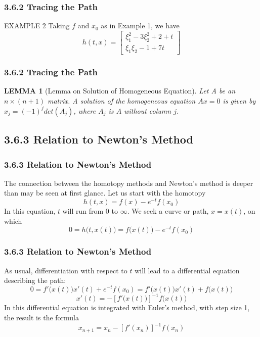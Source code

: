 \documentclass[notheorems,mathserif,table,compress]{beamer}  %
\begin{document}
\begin{frame}
  \frametitle{3.6.2 Tracing the Path}
  \begin{exampleblock}{EXAMPLE 2}  
  Taking $f$ and $x_0$ as in Example 1, we have 
  \begin{displaymath}
  h(t,x)=
  \left[ \begin{array}{ccc}
  \xi_1 ^2-3\xi_2 ^2+2+t\\
  \xi_1\xi_2-1+7t
  \end{array} \right]
  \end{displaymath}
  \end{exampleblock}
\end{frame}


\begin{frame}
  \frametitle{3.6.2 Tracing the Path}
  \newtheorem{lemma}{LEMMA}
  \begin{lemma}[Lemma on Solution of Homogeneous Equation]
  Let A be an $n\times(n+1)$ matrix. A solution of the homogeneous equation $Ax=0$ is given by $x_j=(-1)^j det(A_j)$, where $A_j$ is $A$ without column $j$.
  \end{lemma}
\end{frame}


\subsection{3.6.3 Relation to Newton's Method}

\begin{frame}
  \frametitle{3.6.3 Relation to Newton's Method}
  The connection between the homotopy methods and Newton's method is deeper than may be seen at first glance. Let us start with the homotopy
  \[ h(t,x)=f(x)-e^{-t}f(x_0) \]
  In this equation, $t$ will run from 0 to $\infty$. We seek a curve or path, $x=x(t)$, on which
  \[ 0=h \big( t,x(t) \big) =f \big( x(t) \big) -e^{-t}f(x_0) \]
\end{frame}


\begin{frame}
  \frametitle{3.6.3 Relation to Newton's Method}
  As usual, differentiation with respect to $t$ will lead to a differential equation describing the path:
  \begin{displaymath}
  0=f'\big(x(t)\big)x'(t)+e^{-t}f(x_0)=f'\big(x(t)\big)x'(t)+f\big(x(t)\big)
  \end{displaymath}
  \begin{displaymath}
  x'(t)=-[f'\big(x(t)\big)]^{-1}f\big(x(t)\big)
  \end{displaymath}
  In this differential equation is integrated with Euler's method, with step size 1, the result is the formula
  \[ x_{n+1}=x_{n}-[f'(x_n)]^{-1}f(x_n) \]
\end{frame}
\end{document}
